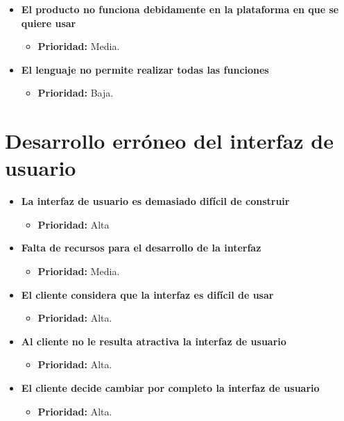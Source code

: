 \documentclass[spanish,a4paper,12pt]{report}	%
\begin{document}
\begin{itemize}
		\item \textbf{El producto no funciona debidamente en la plataforma en que se quiere usar}
			\begin{itemize}
				\item \textbf{Prioridad: }Media.
			\end{itemize}
		
		\item \textbf{El lenguaje no permite realizar todas las funciones}
			\begin{itemize}
				\item \textbf{Prioridad: }Baja.
			\end{itemize}
	\end{itemize}

%
\section{Desarrollo erróneo del interfaz de usuario}
	\begin{itemize}
		\item \textbf{La interfaz de usuario es demasiado difícil de construir}%
			\begin{itemize}
				\item \textbf{Prioridad: }Alta
			\end{itemize}
		
		\item \textbf{Falta de recursos para el desarrollo de la interfaz}
			\begin{itemize}
				\item \textbf{Prioridad: }Media.
			\end{itemize}
		
		\item \textbf{El cliente considera que la interfaz es difícil de usar}%
			\begin{itemize}
				\item \textbf{Prioridad: }Alta.
			\end{itemize}
		
		\item \textbf{Al cliente no le resulta atractiva la interfaz de usuario}%
			\begin{itemize}
				\item \textbf{Prioridad: }Alta.
			\end{itemize}
		
		\item \textbf{El cliente decide cambiar por completo la interfaz de usuario}%
			\begin{itemize}
				\item \textbf{Prioridad: }Alta.
			\end{itemize}
	\end{itemize}
%
\end{document}
